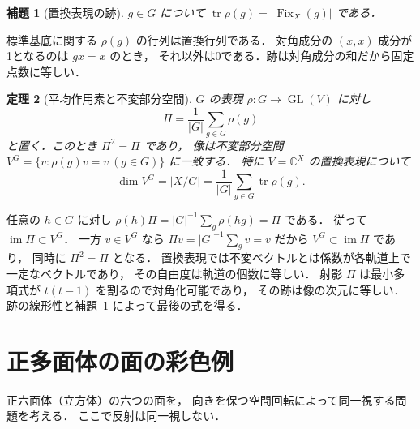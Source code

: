 \documentclass[a5paper,10pt,onecolumn]{jsarticle}
\makeatletter
\theoremstyle{mathnotetheorem}
\newtheorem{theorem}{定理}[section]
\newtheorem{lemma}[theorem]{補題}
\renewcommand{\proofname}{証明}
\renewenvironment{proof}[1][\proofname]{%
  \par\pushQED{\qed}\normalfont\topsep4\p@\@plus2\p@\relax
  \trivlist\item[\hskip\labelsep\bfseries #1]\ignorespaces
}{\popQED\endtrivlist\@endpefalse}
\makeatother
\begin{document}
\begin{lemma}[置換表現の跡]\label{lem:trace}
$g\in G$ について
$\operatorname{tr}\rho(g)=|\operatorname{Fix}_X(g)|$ である．
\end{lemma}
\begin{proof}
標準基底に関する $\rho(g)$ の行列は置換行列である．
対角成分の $(x,x)$ 成分が1となるのは $gx=x$ のとき，
それ以外は0である．跡は対角成分の和だから固定点数に等しい．
\end{proof}

\begin{theorem}[平均作用素と不変部分空間]\label{thm:reynolds}
$G$ の表現 $\rho:G\to\operatorname{GL}(V)$ に対し
\[
 \Pi=\frac1{|G|}\sum_{g\in G}\rho(g)
\]
と置く．このとき $\Pi^2=\Pi$ であり，
像は不変部分空間
$V^G=\{v:\rho(g)v=v\ (g\in G)\}$ に一致する．
特に $V=\mathbb C^X$ の置換表現について
\[
 \dim V^G=|X/G|
 =\frac1{|G|}\sum_{g\in G}\operatorname{tr}\rho(g).
\]
\end{theorem}
\begin{proof}
任意の $h\in G$ に対し
$\rho(h)\Pi=|G|^{-1}\sum_g\rho(hg)=\Pi$ である．
従って $\operatorname{im}\Pi\subset V^G$．
一方 $v\in V^G$ なら
$\Pi v=|G|^{-1}\sum_gv=v$ だから
$V^G\subset\operatorname{im}\Pi$ であり，
同時に $\Pi^2=\Pi$ となる．
置換表現では不変ベクトルとは係数が各軌道上で一定なベクトルであり，
その自由度は軌道の個数に等しい．
射影 $\Pi$ は最小多項式が $t(t-1)$ を割るので対角化可能であり，
その跡は像の次元に等しい．
跡の線形性と補題~\ref{lem:trace} によって最後の式を得る．
\end{proof}

\section{正多面体の面の彩色例}
正六面体（立方体）の六つの面を，
向きを保つ空間回転によって同一視する問題を考える．
ここで反射は同一視しない．
\end{document}
